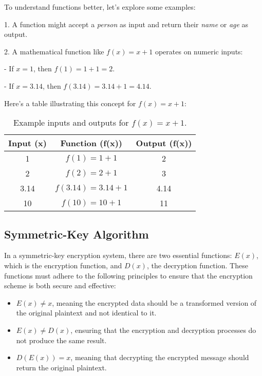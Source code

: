 \documentclass[12pt,a4paper]{report}
\begin{document}
To understand functions better, let’s explore some examples:

1. A function might accept a \textit{person} as input and return their \textit{name} or \textit{age} as output.

2. A mathematical function like \(f(x) = x + 1\) operates on numeric inputs:

    - If \(x = 1\), then \(f(1) = 1 + 1 = 2\).

    - If \(x = 3.14\), then \(f(3.14) = 3.14 + 1 = 4.14\).

Here’s a table illustrating this concept for \(f(x) = x + 1\):

\begin{table}[h!]
    \centering
    \begin{tabular}{|c|c|c|}
        \hline
        \textbf{Input (x)} & \textbf{Function (f(x))} & \textbf{Output (f(x))} \\ \hline
        1 & \(f(1) = 1 + 1\) & 2 \\ \hline
        2 & \(f(2) = 2 + 1\) & 3 \\ \hline
        3.14 & \(f(3.14) = 3.14 + 1\) & 4.14 \\ \hline
        10 & \(f(10) = 10 + 1\) & 11 \\ \hline
    \end{tabular}
    \caption{Example inputs and outputs for \(f(x) = x + 1\).}
    \label{table:function-example}
\end{table}


\subsection{Symmetric-Key Algorithm}

In a symmetric-key encryption system, there are two essential functions: \( E(x) \), which is the encryption function, and \( D(x) \), the decryption function. These functions must adhere to the following principles to ensure that the encryption scheme is both secure and effective:

\begin{itemize}
    \item \( E(x) \neq x \), meaning the encrypted data should be a transformed version of the original plaintext and not identical to it.
    \item \( E(x) \neq D(x) \), ensuring that the encryption and decryption processes do not produce the same result.
    \item \( D(E(x)) = x \), meaning that decrypting the encrypted message should return the original plaintext.
\end{itemize}
\end{document}
